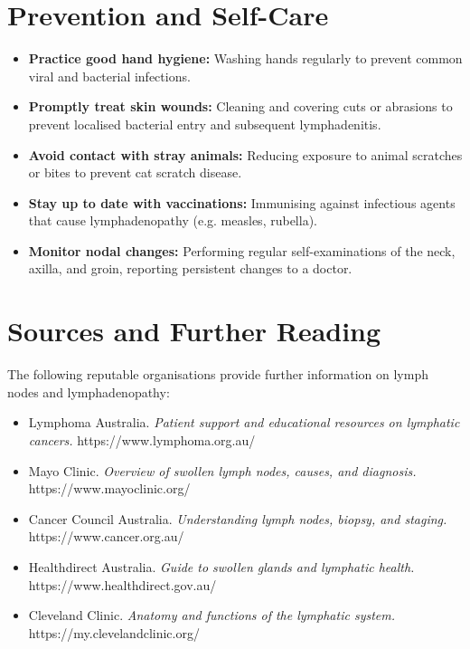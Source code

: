 \section*{Prevention and Self-Care}
\begin{itemize}
    \item \textbf{Practice good hand hygiene:} Washing hands regularly to prevent common viral and bacterial infections.
    \item \textbf{Promptly treat skin wounds:} Cleaning and covering cuts or abrasions to prevent localised bacterial entry and subsequent lymphadenitis.
    \item \textbf{Avoid contact with stray animals:} Reducing exposure to animal scratches or bites to prevent cat scratch disease.
    \item \textbf{Stay up to date with vaccinations:} Immunising against infectious agents that cause lymphadenopathy (e.g. measles, rubella).
    \item \textbf{Monitor nodal changes:} Performing regular self-examinations of the neck, axilla, and groin, reporting persistent changes to a doctor.
\end{itemize}

\section*{Sources and Further Reading}
The following reputable organisations provide further information on lymph nodes and lymphadenopathy:
\begin{itemize}
    \item Lymphoma Australia. \textit{Patient support and educational resources on lymphatic cancers.} https://www.lymphoma.org.au/
    \item Mayo Clinic. \textit{Overview of swollen lymph nodes, causes, and diagnosis.} https://www.mayoclinic.org/
    \item Cancer Council Australia. \textit{Understanding lymph nodes, biopsy, and staging.} https://www.cancer.org.au/
    \item Healthdirect Australia. \textit{Guide to swollen glands and lymphatic health.} https://www.healthdirect.gov.au/
    \item Cleveland Clinic. \textit{Anatomy and functions of the lymphatic system.} https://my.clevelandclinic.org/
\end{itemize}
